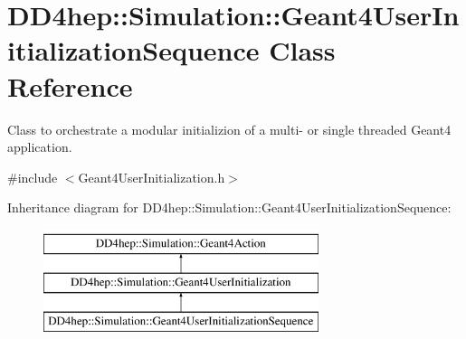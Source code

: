 \hypertarget{class_d_d4hep_1_1_simulation_1_1_geant4_user_initialization_sequence}{}\section{D\+D4hep\+:\+:Simulation\+:\+:Geant4\+User\+Initialization\+Sequence Class Reference}
\label{class_d_d4hep_1_1_simulation_1_1_geant4_user_initialization_sequence}


Class to orchestrate a modular initializion of a multi-\/ or single threaded Geant4 application.  




{\ttfamily \#include $<$Geant4\+User\+Initialization.\+h$>$}

Inheritance diagram for D\+D4hep\+:\+:Simulation\+:\+:Geant4\+User\+Initialization\+Sequence\+:\begin{figure}[H]
\begin{center}
\leavevmode
\includegraphics[height=3.000000cm]{class_d_d4hep_1_1_simulation_1_1_geant4_user_initialization_sequence}
\end{center}
\end{figure}
